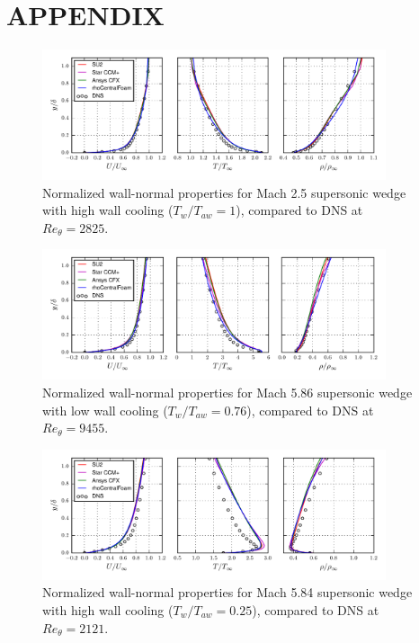 \documentclass[journal ]{new-aiaa}
\begin{document}
\section*{APPENDIX}
\begin{figure}[h]
\centering
  \includegraphics[width=0.9\textwidth]{figs/Plate_RANS2_Comp_new.pdf}
  \caption{Normalized wall-normal properties for Mach 2.5 supersonic wedge with high wall cooling ($T_w/T_{aw} = 1$), compared to DNS at $Re_\theta = 2825$.}
  \label{fig:Plate_RANS2}
\end{figure}

\begin{figure}[h]
\centering
  \includegraphics[width=0.9\textwidth]{figs/Plate_RANS6AD_Comp_new.pdf}
  \caption{Normalized wall-normal properties for Mach 5.86 supersonic wedge with low wall cooling ($T_w/T_{aw} = 0.76$), compared to DNS at $Re_\theta = 9455$.}
  \label{fig:Plate_RANS6AD}
\end{figure}

\begin{figure}[h]
\centering
  \includegraphics[width=0.9\textwidth]{figs/Plate_RANS6_Comp_new.pdf}
  \caption{Normalized wall-normal properties for Mach 5.84 supersonic wedge with high wall cooling ($T_w/T_{aw} = 0.25$), compared to DNS at $Re_\theta = 2121$.}
  \label{fig:Plate_RANS6}
\end{figure}
\end{document}
